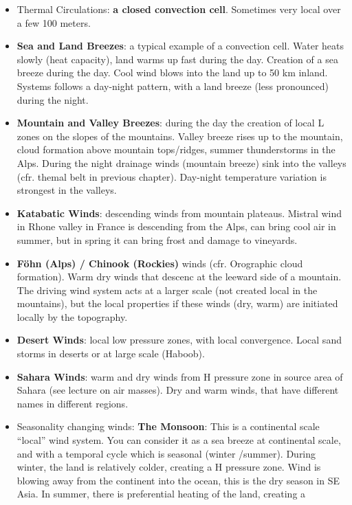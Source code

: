 \documentclass[oneside]{book}
\begin{document}
\begin{itemize}
\item
  Thermal Circulations: \textbf{a closed convection cell}. Sometimes
  very local over a few 100 meters.
\item
  \textbf{Sea and Land Breezes}: a typical example of a convection cell.
  Water heats slowly (heat capacity), land warms up fast during the day.
  Creation of a sea breeze during the day. Cool wind blows into the land
  up to 50 km inland. Systems follows a day-night pattern, with a land
  breeze (less pronounced) during the night.
\item
  \textbf{Mountain and Valley Breezes}: during the day the creation of
  local L zones on the slopes of the mountains. Valley breeze rises up
  to the mountain, cloud formation above mountain tops/ridges, summer
  thunderstorms in the Alps. During the night drainage winds (mountain
  breeze) sink into the valleys (cfr. themal belt in previous chapter).
  Day-night temperature variation is strongest in the valleys.
\item
  \textbf{Katabatic Winds}: descending winds from mountain plateaus.
  Mistral wind in Rhone valley in France is descending from the Alps,
  can bring cool air in summer, but in spring it can bring frost and
  damage to vineyards.
\item
  \textbf{Föhn (Alps) / Chinook (Rockies)} winds (cfr. Orographic cloud
  formation). Warm dry winds that descenc at the leeward side of a
  mountain. The driving wind system acts at a larger scale (not created
  local in the mountains), but the local properties if these winds (dry,
  warm) are initiated locally by the topography.
\item
  \textbf{Desert Winds}: local low pressure zones, with local
  convergence. Local sand storms in deserts or at large scale (Haboob).
\item
  \textbf{Sahara Winds}: warm and dry winds from H pressure zone in
  source area of Sahara (see lecture on air masses). Dry and warm winds,
  that have different names in different regions.
\item
  Seasonality changing winds: \textbf{The Monsoon}: This is a
  continental scale ``local'' wind system. You can consider it as a sea
  breeze at continental scale, and with a temporal cycle which is
  seasonal (winter /summer). During winter, the land is relatively
  colder, creating a H pressure zone. Wind is blowing away from the
  continent into the ocean, this is the dry season in SE Asia. In
  summer, there is preferential heating of the land, creating a

\end{itemize}
\end{document}
